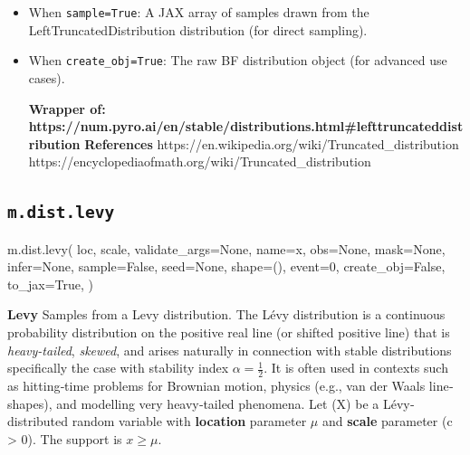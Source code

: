 \documentclass[
  letterpaper,
  DIV=11,
  numbers=noendperiod]{scrartcl}
\newenvironment{Shaded}{\begin{snugshade}}{\end{snugshade}}
\newcommand{\DecValTok}[1]{\textcolor[rgb]{0.68,0.00,0.00}{#1}}
\newcommand{\NormalTok}[1]{\textcolor[rgb]{0.00,0.23,0.31}{#1}}
\newcommand{\OperatorTok}[1]{\textcolor[rgb]{0.37,0.37,0.37}{#1}}
\newcommand{\StringTok}[1]{\textcolor[rgb]{0.13,0.47,0.30}{#1}}
\newcommand{\VariableTok}[1]{\textcolor[rgb]{0.07,0.07,0.07}{#1}}
\begin{document}
\begin{itemize}
\item
  When \texttt{sample=True}: A JAX array of samples drawn from the
  LeftTruncatedDistribution distribution (for direct sampling).
\item
  When \texttt{create\_obj=True}: The raw BF distribution object (for
  advanced use cases).

  \textbf{Wrapper of:
  https://num.pyro.ai/en/stable/distributions.html\#lefttruncateddistribution}
  \textbf{References}
  https://en.wikipedia.org/wiki/Truncated\_distribution
  https://encyclopediaofmath.org/wiki/Truncated\_distribution
\end{itemize}

\subsection{\texorpdfstring{\texttt{m.dist.levy}}{m.dist.levy}}\label{levy}

\begin{Shaded}
\begin{Highlighting}[]
\NormalTok{m.dist.levy(}
\NormalTok{    loc,}
\NormalTok{    scale,}
\NormalTok{    validate\_args}\OperatorTok{=}\VariableTok{None}\NormalTok{,}
\NormalTok{    name}\OperatorTok{=}\StringTok{\textquotesingle{}x\textquotesingle{}}\NormalTok{,}
\NormalTok{    obs}\OperatorTok{=}\VariableTok{None}\NormalTok{,}
\NormalTok{    mask}\OperatorTok{=}\VariableTok{None}\NormalTok{,}
\NormalTok{    infer}\OperatorTok{=}\VariableTok{None}\NormalTok{,}
\NormalTok{    sample}\OperatorTok{=}\VariableTok{False}\NormalTok{,}
\NormalTok{    seed}\OperatorTok{=}\VariableTok{None}\NormalTok{,}
\NormalTok{    shape}\OperatorTok{=}\NormalTok{(),}
\NormalTok{    event}\OperatorTok{=}\DecValTok{0}\NormalTok{,}
\NormalTok{    create\_obj}\OperatorTok{=}\VariableTok{False}\NormalTok{,}
\NormalTok{    to\_jax}\OperatorTok{=}\VariableTok{True}\NormalTok{,}
\NormalTok{)}
\end{Highlighting}
\end{Shaded}

\textbf{Levy} Samples from a Levy distribution. The Lévy distribution is
a continuous probability distribution on the positive real line (or
shifted positive line) that is \emph{heavy-tailed}, \emph{skewed}, and
arises naturally in connection with stable distributions specifically
the case with stability index \(\alpha = \tfrac12\). It is often used in
contexts such as hitting‐time problems for Brownian motion, physics
(e.g., van der Waals line‐shapes), and modelling very heavy‐tailed
phenomena. Let (X) be a Lévy‐distributed random variable with
\textbf{location} parameter \(\mu\) and \textbf{scale} parameter (c
\textgreater{} 0). The support is \(x \ge \mu\).
\end{document}
